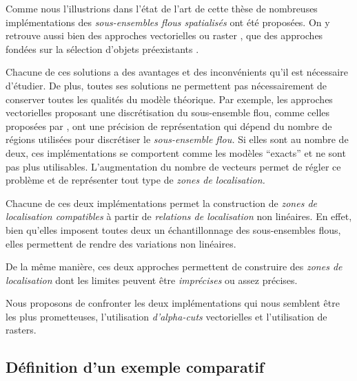 Comme nous l'illustrions dans l'état de l'art de cette thèse de
nombreuses implémentations des \emph{sous-ensembles flous spatialisés}
ont été proposées. On y retrouve aussi bien des approches vectorielles
\autocite{Kanjilal2010,Dilo2007,Zoghlami2016} ou raster
\autocite{Bloch1996}, que des approches fondées sur la sélection
d'objets préexistants \autocite{Duraciova2017}.

Chacune de ces solutions a des avantages et des inconvénients qu'il
est nécessaire d'étudier. De plus, toutes ses solutions ne permettent
pas nécessairement de conserver toutes les qualités du modèle
théorique. Par exemple, les approches vectorielles proposant une
discrétisation du sous-ensemble flou, comme celles proposées par
\textcite{Kanjilal2010,Zoghlami2016}, ont une précision de
représentation qui dépend du nombre de régions utilisées pour
discrétiser le \emph{sous-ensemble flou.} Si elles sont au nombre de
deux, ces implémentations se comportent comme les modèles
\enquote{exacts} et ne sont pas plus utilisables. L'augmentation du
nombre de vecteurs permet de régler ce problème et de représenter tout
type de \emph{zones de localisation.}




Chacune de ces deux implémentations permet la construction de
\emph{zones de localisation compatibles} à partir de \emph{relations
  de localisation} non linéaires. En effet, bien qu'elles imposent
toutes deux un échantillonnage des sous-ensembles flous, elles
permettent de rendre des variations non linéaires.

De la même manière, ces deux approches permettent de construire des
\emph{zones de localisation} dont les limites peuvent être
\emph{imprécises} ou assez précises.


Nous proposons de confronter les deux implémentations qui nous
semblent être les plus prometteuses, l'utilisation \emph{d'alpha-cuts}
vectorielles et l'utilisation de rasters.

\subsection{Définition d'un exemple comparatif}


